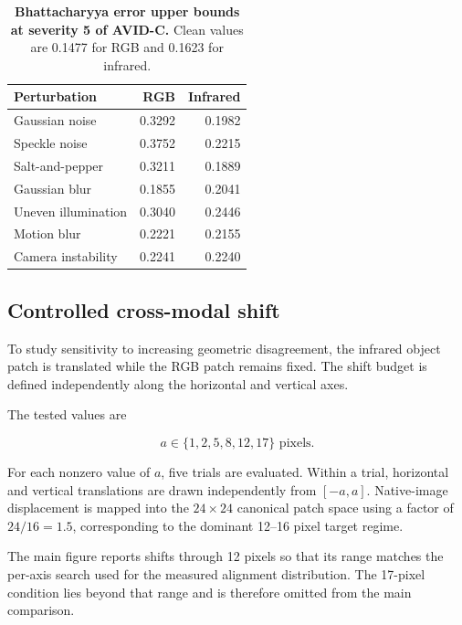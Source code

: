 \documentclass[10pt]{article}
\newcommand{\corrupt}{\textsc{AVID-C}}
\begin{document}
\begin{table}[h]
\centering
\caption{\textbf{Bhattacharyya error upper bounds at severity 5 of \corrupt{}.}
Clean values are 0.1477 for RGB and 0.1623 for infrared.}
\label{tab:severityfive}
\small
\begin{tabular}{lrr}
\toprule
Perturbation & RGB & Infrared \\
\midrule
Gaussian noise & 0.3292 & 0.1982 \\
Speckle noise & 0.3752 & 0.2215 \\
Salt-and-pepper & 0.3211 & 0.1889 \\
Gaussian blur & 0.1855 & 0.2041 \\
Uneven illumination & 0.3040 & 0.2446 \\
Motion blur & 0.2221 & 0.2155 \\
Camera instability & 0.2241 & 0.2240 \\
\bottomrule
\end{tabular}
\end{table}

\subsection{Controlled cross-modal shift}

To study sensitivity to increasing geometric disagreement, the infrared object patch is translated while the RGB patch remains fixed. The shift budget is defined independently along the horizontal and vertical axes.

The tested values are

\begin{equation}
a\in\{1,2,5,8,12,17\}\text{ pixels}.
\end{equation}

For each nonzero value of $a$, five trials are evaluated. Within a trial, horizontal and vertical translations are drawn independently from $[-a,a]$. Native-image displacement is mapped into the $24\times24$ canonical patch space using a factor of $24/16=1.5$, corresponding to the dominant 12--16 pixel target regime.

The main figure reports shifts through 12 pixels so that its range matches the per-axis search used for the measured alignment distribution. The 17-pixel condition lies beyond that range and is therefore omitted from the main comparison.
\end{document}
